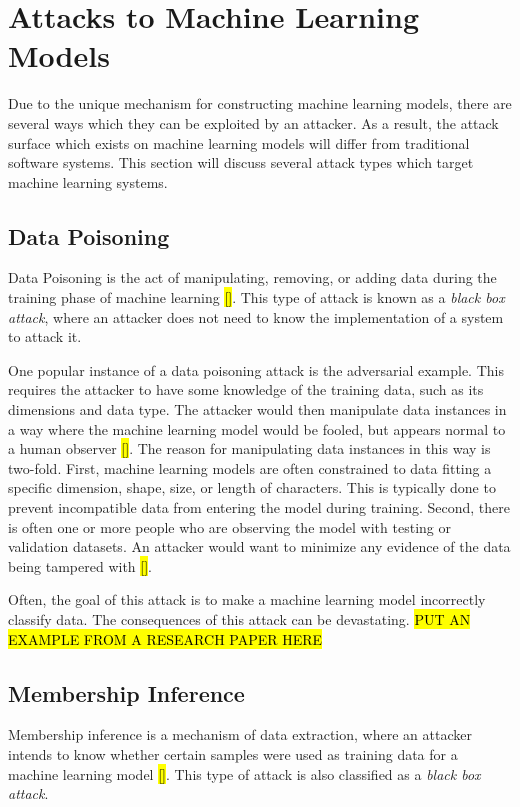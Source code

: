 \documentclass[11pt,conference]{IEEEtran}
\begin{document}
\section{Attacks to Machine Learning Models}
Due to the unique mechanism for constructing machine learning models, there are
several ways which they can be exploited by an attacker. As a result, the
attack surface which exists on machine learning models will differ from
traditional software systems.
This section will discuss several attack types which target machine learning
systems.

\subsection{Data Poisoning}
Data Poisoning is the act of manipulating, removing, or adding
data during the training phase of machine learning \hl{[]}. This type of attack is
known as a \emph{black box attack}, where an attacker does not need to know the
implementation of a system to attack it.

One popular instance of a data poisoning attack is the adversarial
example. This requires the attacker to have some knowledge of the
training data, such as its dimensions and data type. The attacker would then
manipulate data instances in a way where the machine learning model would
be fooled, but appears normal to a human observer \hl{[]}. The reason for manipulating
data instances in this way is two-fold. First, machine learning models are
often constrained to data fitting a specific dimension, shape, size, or length
of characters. This is typically done to prevent incompatible data from
entering the model during training. Second, there is often one or more people
who are observing the model with testing or validation datasets. An attacker
would want to minimize any evidence of the data being tampered with \hl{[]}.

Often, the goal of this
attack is to make a machine learning model incorrectly classify data. The
consequences of this attack can be devastating. 
\hl{PUT AN EXAMPLE FROM A RESEARCH PAPER HERE}

\subsection{Membership Inference}
Membership inference is a mechanism of data extraction, where an attacker 
intends to know whether certain samples were used as training data for a
machine learning model \hl{[]}. This type of attack is also classified as a \emph{black box attack}.
\end{document}
